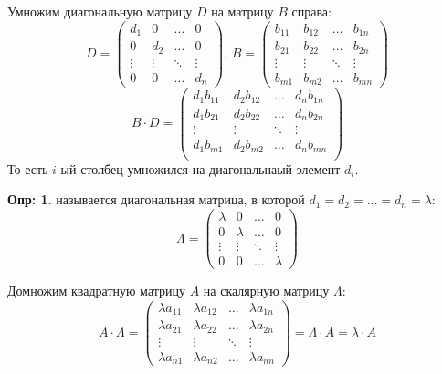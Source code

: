 \documentclass[12pt]{article}
\theoremstyle{definition}
\newtheorem{defn}{Опр:}
\begin{document}
Умножим диагональную матрицу $D$ на матрицу $B$ справа:
$$
	D = 
	\begin{pmatrix}
		d_1  & 0 & \dotsc & 0\\
		0 & d_2 & \dotsc & 0\\
		\vdots & \vdots & \ddots & \vdots \\
		0 & 0 & \dotsc & d_n
	\end{pmatrix}, \, 
	B = 
	\begin{pmatrix}
		b_{11} & b_{12} & \dotsc & b_{1n} \\
		b_{21} & b_{22} & \dotsc & b_{2n}\\
		\vdots & \vdots & \ddots & \vdots \\
		b_{m1} & b_{m2} & \dotsc & b_{mn}
	\end{pmatrix}
$$
$$
	B{\cdot}D = 
	\begin{pmatrix}
		d_1 b_{11} & d_2 b_{12} & \dotsc & d_n b_{1n}\\
		d_1 b_{21} & d_2 b_{22} & \dotsc & d_n b_{2n}\\
		\vdots & \vdots & \ddots & \vdots\\
		d_1 b_{m1} & d_2 b_{m2} & \dotsc & d_n b_{mn}\\
	\end{pmatrix}
$$
То есть $i$-ый столбец умножился на диагональнаый элемент $d_i$.

\begin{defn}
	 называется диагональная матрица, в которой $d_1 = d_2 = \dotsc = d_n = \lambda$:
	$$
		\Lambda = \begin{pmatrix}
			\lambda  & 0 & \dotsc & 0\\
			0 & \lambda & \dotsc & 0\\
			\vdots & \vdots & \ddots & \vdots \\
			0 & 0 & \dotsc & \lambda
		\end{pmatrix}
	$$
\end{defn}
Домножим квадратную матрицу $A$ на скалярную матрицу $\Lambda$:
$$
	A{\cdot}\Lambda = 
	\begin{pmatrix}
		\lambda a_{11} &\lambda a_{12} & \dotsc &\lambda a_{1n} \\
		\lambda a_{21} &\lambda a_{22} & \dotsc &\lambda a_{2n}\\
		\vdots & \vdots & \ddots & \vdots \\
		\lambda a_{n1} &\lambda a_{n2} & \dotsc &\lambda a_{nn}
	\end{pmatrix}
	= \Lambda {\cdot} A = \lambda{\cdot}A
$$
\end{document}
